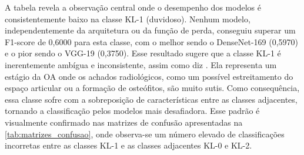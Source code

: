 A tabela revela a observação central onde o desempenho dos modelos é consistentemente baixo na classe KL-1 (duvidoso). Nenhum modelo, independentemente da arquitetura ou da função de perda, conseguiu superar um F1-score de 0,6000 para esta classe, com o melhor sendo o DenseNet-169 (0,5970) e o pior sendo o VGG-19 (0,3750). Esse resultado sugere que a classe KL-1 é inerentemente ambígua e inconsistente, assim como diz . Ela representa um estágio da OA onde os achados radiológicos, como um possível estreitamento do espaço articular ou a formação de osteófitos, são muito sutis. Como consequência, essa classe sofre com a sobreposição de características entre as classes adjacentes, tornando a classificação pelos modelos mais desafiadora. Esse padrão é visualmente confirmado nas matrizes de confusão apresentadas na \autoref{tab:matrizes_confusao}, onde observa-se um número elevado de classificações incorretas entre as classes KL-1 e as classes adjacentes KL-0 e KL-2.

